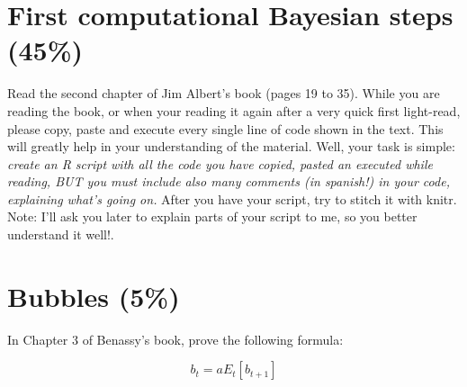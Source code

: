 \documentclass[11pt]{article}
\begin{document}
\section{First computational Bayesian steps  (45\%)}
Read the second chapter of Jim Albert's book (pages 19 to 35). While you are reading the book, or when your reading it again after a very quick first light-read, please copy, paste and execute every single line of code shown in the text. This will greatly help in your understanding of the material. Well, your task is simple: \emph{create an R script with all the code you have copied, pasted an executed while reading, BUT you must include also many comments (in spanish!)  in your code, explaining what's going on.} After you have your script, try to stitch it with knitr. Note: I'll ask you later to explain parts of your script to me, so you better understand it well!.

\section{Bubbles  (5\%)}

In Chapter 3 of Benassy's book, prove the following formula:

\[ b_t = a E_t[b_{t+1}]  \]
\end{document}

